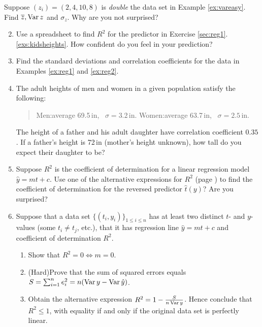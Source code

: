 \begin{exercises}{}{}
	\exstart Suppose $(z_i)=(2,4,10,8)$ is \emph{double} the data set in Example \ref{ex:vareasy}. Find $\overline{z},\operatorname{Var} z$ and $\sigma_z$. Why are you not surprised?
	
	\begin{enumerate}\setcounter{enumi}{1}
	  \item Use a spreadsheet to find $R^2$ for the predictor in Exercise \ref*{sec:reg1}.\ref{exs:kidsheights}. How confident do you feel in your prediction?
	  
	  
	  \item Find the standard deviations and correlation coefficients for the data in Examples \ref{ex:reg1} and \ref{ex:reg2}.
	  
	  
	  \item The adult heights of men and women in a given population satisfy the following:
	  \begin{quote}
	  	Men:\lstsp average 69.5\,in, \ $\sigma=3.2$\,in.\qquad
	  	Women:\lstsp average 63.7\,in, \ $\sigma=2.5$\,in.
	  \end{quote}
	  The height of a father and his adult daughter have correlation coefficient $0.35$. If a father's height is 72\,in (mother's height unknown), how tall do you expect their daughter to be?
	
	  
	  \item Suppose $R^2$ is the coefficient of determination for a linear regression model $\hat y=mt+c$. Use one of the alternative expressions for $R^2$ (page \pageref{pg:rsqalt}) to find the coefficient of determination for the reversed predictor $\hat t(y)$? Are you surprised?
	  	  
	  
	  \item\label{exs:Rsqalt} Suppose that a data set $\{(t_i,y_i)\}_{1\le i\le n}$ has at least two distinct $t$- and $y$-values (some $t_i\neq t_j$, etc.), that it has regression line $\hat y=mt+c$ and coefficient of determination $R^2$.
	  \begin{enumerate}
	    \item Show that $R^2=0\Longleftrightarrow m=0$.
	    \item (Hard)\lstsp Prove that the sum of squared errors equals $S=\sum_{i=1}^ne_i^2 =n(\operatorname{Var} y-\operatorname{Var}\hat y)$.
	    \item Obtain the alternative expression $R^2=1-\frac S{n\operatorname{Var} y}$. Hence conclude that $R^2\le 1$, with equality if and only if the original data set is perfectly linear.
		\end{enumerate}	
	\end{enumerate}

\end{exercises}

